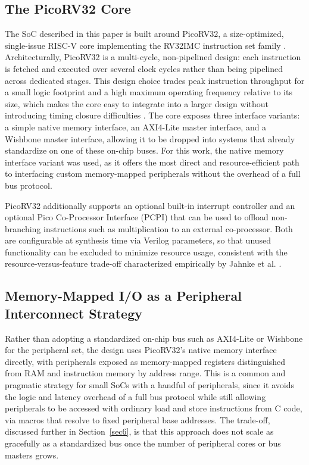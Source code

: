 \documentclass[runningheads]{llncs}
\begin{document}
\subsection{The PicoRV32 Core}
The SoC described in this paper is built around PicoRV32, a size-optimized, single-issue RISC-V core implementing the RV32IMC instruction set family \cite{wolf2019picorv32}. Architecturally, PicoRV32 is a multi-cycle, non-pipelined design: each instruction is fetched and executed over several clock cycles rather than being pipelined across dedicated stages. This design choice trades peak instruction throughput for a small logic footprint and a high maximum operating frequency relative to its size, which makes the core easy to integrate into a larger design without introducing timing closure difficulties \cite{wolf2019picorv32}. The core exposes three interface variants: a simple native memory interface, an AXI4-Lite master interface, and a Wishbone master interface, allowing it to be dropped into systems that already standardize on one of these on-chip buses. For this work, the native memory interface variant was used, as it offers the most direct and resource-efficient path to interfacing custom memory-mapped peripherals without the overhead of a full bus protocol.

PicoRV32 additionally supports an optional built-in interrupt controller and an optional Pico Co-Processor Interface (PCPI) that can be used to offload non-branching instructions  such as multiplication  to an external co-processor. Both are configurable at synthesis time via Verilog parameters, so that unused functionality can be excluded to minimize resource usage, consistent with the resource-versus-feature trade-off characterized empirically by Jahnke et al. \cite{jahnke2023performance}.

\subsection{Memory-Mapped I/O as a Peripheral Interconnect Strategy}
Rather than adopting a standardized on-chip bus such as AXI4-Lite or Wishbone for the peripheral set, the design uses PicoRV32's native memory interface directly, with peripherals exposed as memory-mapped registers distinguished from RAM and instruction memory by address range. This is a common and pragmatic strategy for small SoCs with a handful of peripherals, since it avoids the logic and latency overhead of a full bus protocol while still allowing peripherals to be accessed with ordinary load and store instructions from C code, via macros that resolve to fixed peripheral base addresses. The trade-off, discussed further in Section~\ref{sec6}, is that this approach does not scale as gracefully as a standardized bus once the number of peripheral cores or bus masters grows.
\end{document}
